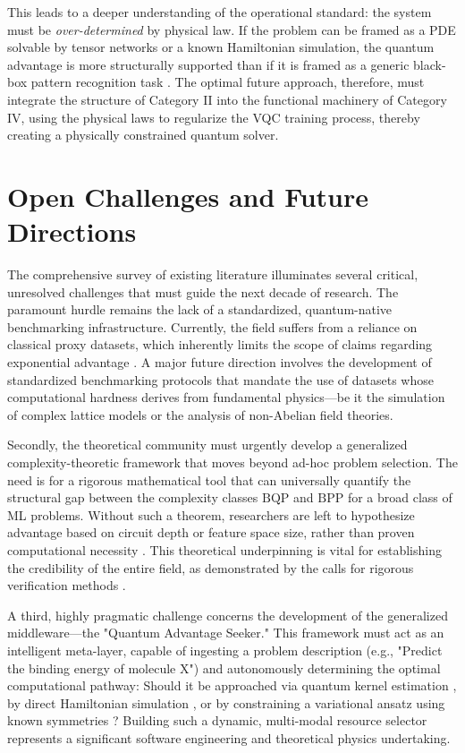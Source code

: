 \documentclass{article}
\begin{document}
This leads to a deeper understanding of the operational standard: the system must be \textit{over-determined} by physical law. If the problem can be framed as a PDE solvable by tensor networks or a known Hamiltonian simulation, the quantum advantage is more structurally supported than if it is framed as a generic black-box pattern recognition task \cite{chen2022quantum}. The optimal future approach, therefore, must integrate the structure of Category II into the functional machinery of Category IV, using the physical laws to regularize the VQC training process, thereby creating a physically constrained quantum solver.

\section{Open Challenges and Future Directions}

\label{sec:open\_challenges\_and\_future\_directions}

The comprehensive survey of existing literature illuminates several critical, unresolved challenges that must guide the next decade of research. The paramount hurdle remains the lack of a standardized, quantum-native benchmarking infrastructure. Currently, the field suffers from a reliance on classical proxy datasets, which inherently limits the scope of claims regarding exponential advantage \cite{cerezo2022challenges}. A major future direction involves the development of standardized benchmarking protocols that mandate the use of datasets whose computational hardness derives from fundamental physics---be it the simulation of complex lattice models or the analysis of non-Abelian field theories.

Secondly, the theoretical community must urgently develop a generalized complexity-theoretic framework that moves beyond ad-hoc problem selection. The need is for a rigorous mathematical tool that can universally quantify the structural gap between the complexity classes $\text{BQP}$ and $\text{BPP}$ for a broad class of ML problems. Without such a theorem, researchers are left to hypothesize advantage based on circuit depth or feature space size, rather than proven computational necessity \cite{huang2021informationtheoretic}. This theoretical underpinning is vital for establishing the credibility of the entire field, as demonstrated by the calls for rigorous verification methods \cite{liu2024verifying}.

A third, highly pragmatic challenge concerns the development of the generalized middleware---the "Quantum Advantage Seeker." This framework must act as an intelligent meta-layer, capable of ingesting a problem description (e.g., "Predict the binding energy of molecule X") and autonomously determining the optimal computational pathway: Should it be approached via quantum kernel estimation \cite{jager2023universal}, by direct Hamiltonian simulation , or by constraining a variational ansatz using known symmetries \cite{cuomo2022scientific}? Building such a dynamic, multi-modal resource selector represents a significant software engineering and theoretical physics undertaking.
\end{document}
